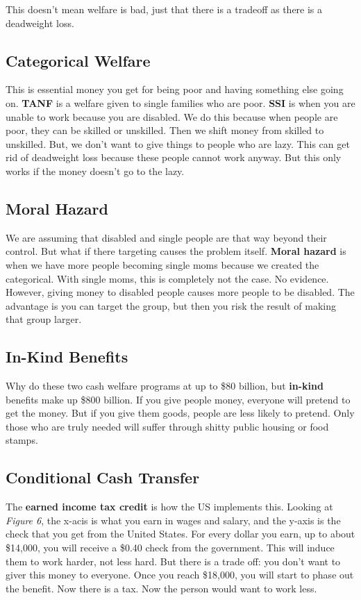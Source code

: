 \documentclass{article}
\begin{document}
This doesn't mean welfare is bad, just that there is a tradeoff as there is a
deadweight loss. 

\subsection{ Categorical Welfare }

This is essential money you get for being poor and having something else going
on. \textbf{TANF} is a welfare given to single families who are poor.
\textbf{SSI} is when you are unable to work because you are disabled. We do this
because when people are poor, they can be skilled or unskilled. Then we shift
money from skilled to unskilled. But, we don't want to give things to people who
are lazy. This can get rid of deadweight loss because these people cannot work
anyway. But this only works if the money doesn't go to the lazy.

\subsection{ Moral Hazard }

We are assuming that disabled and single people are that way beyond their
control. But what if there targeting causes the problem itself. \textbf{Moral
hazard} is when we have more people becoming single moms because we created the
categorical. With single moms, this is completely not the case. No evidence.
However, giving money to disabled people causes more people to be disabled.
The advantage is you can target the group, but then you risk the result of
making that group larger.

\subsection{ In-Kind Benefits }

Why do these two cash welfare programs at up to \$80 billion, but
\textbf{in-kind} benefits make up \$800 billion. If you give people money,
everyone will pretend to get the money. But if you give them goods, people are
less likely to pretend. Only those who are truly needed will suffer through
shitty public housing or food stamps. 

\subsection{ Conditional Cash Transfer }

The \textbf{earned income tax credit} is how the US implements this. Looking at
\textit{Figure 6}, the x-acis is what you earn in wages and salary, and the
y-axis is the check that you get from the United States. For every dollar you
earn, up to about \$14,000, you will receive a \$0.40 check from the government.
This will induce them to work harder, not less hard. But there is a trade off:
you don't want to giver this money to everyone. Once you reach \$18,000, you
will start to phase out the benefit. Now there is a tax. Now the person would
want to work less. 
\end{document}
